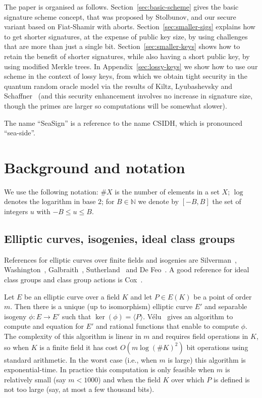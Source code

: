 \documentclass{llncs}
\newcommand{\N}{\mathbb{N}}
\begin{document}
The paper is organised as follows.
Section~\ref{sec:basic-scheme} gives the basic signature scheme concept, that was proposed by Stolbunov, and our secure variant based on Fiat-Shamir with aborts.
Section~\ref{sec:smaller-sigs} explains how to get shorter signatures, at the expense of public key size, by using challenges that are more than just a single bit.
Section~\ref{sec:smaller-keys} shows how to retain the benefit of shorter signatures, while also having a short public key, by using modified Merkle trees.
In Appendix~\ref{sec:lossy-keys} we show how to use our scheme in the context of lossy keys, from which we obtain tight security in the quantum random oracle model via the results of Kiltz, Lyubashevsky and Schaffner~\cite{KLS18} (and this security enhancement involves no increase in signature size, though the primes are larger so computations will be somewhat slower).


The name ``SeaSign'' is a reference to the name CSIDH, which is pronounced ``sea-side''.




\section{Background and notation}


We use the following notation: 
$\#X$ is the number of elements in a set $X$;
$\log$ denotes the logarithm in base $2$;
for $B \in \N$ we denote by $[-B,B]$ the set of integers $u$ with $-B \le u \le B$.


\subsection{Elliptic curves, isogenies, ideal class groups}


References for elliptic curves over finite fields and isogenies are Silverman~\cite{Sil86}, Washington~\cite{Was08}, Galbraith~\cite{Gal12}, Sutherland~\cite{Sut17} and De Feo~\cite{DF17}.
A good reference for ideal class groups and class group actions is Cox~\cite{Cox}.

Let $E$ be an elliptic curve over a field $K$ and let $P \in E( K )$ be a point of order $m$.
Then there is a unique (up to isomorphism) elliptic curve $E'$ and separable isogeny $\phi : E \to E'$ such that $\ker( \phi ) = \langle P \rangle$.
V{\' e}lu~\cite{velu71} gives an algorithm to compute and equation for $E'$ and rational functions that enable to compute $\phi$.
The complexity of this algorithm is linear in $m$ and requires field operations in $K$, so when $K$ is a finite field it has cost $O( m \log( \#K )^2 )$ bit operations using standard arithmetic.
In the worst case (i.e., when $m$ is large) this algorithm is exponential-time.
In practice this computation is only feasible when $m$ is relatively small (say $m < 1000$) and when the field $K$ over which $P$ is defined is not too large (say, at most a few thousand bits).
\end{document}
